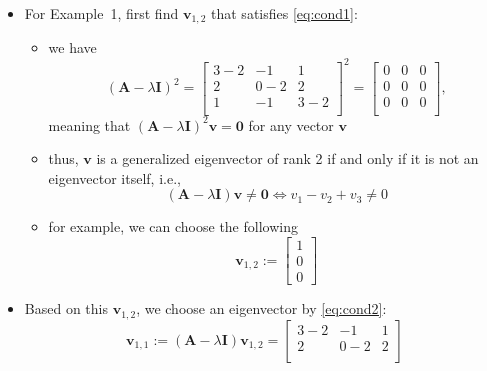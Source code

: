 \documentclass[12pt,a4paper]{article}
\begin{document}
\begin{itemize}
\begin{itemize}
  \item For Example~1,
    first find $\bm{v}_{1,2}$ that satisfies \eqref{eq:cond1}:
    \begin{itemize}
    \item we have
      \begin{equation}\nonumber%
        (\bm{A}-\lambda \bm{I})^{2} =
        \begin{bmatrix}
          3-2 & -1 & 1 \\
          2 & 0-2 & 2 \\
          1 & -1 & 3-2 \\
        \end{bmatrix}^{2}
        =
        \begin{bmatrix}
          0 & 0 & 0 \\
          0 & 0 & 0 \\
          0 & 0 & 0 \\
        \end{bmatrix},
      \end{equation}
      meaning that
      $(\bm{A}-\lambda \bm{I})^{2}\bm{v}=\bm{0}$ for any vector $\bm{v}$
    \item thus, $\bm{v}$ is a generalized eigenvector of rank 2 if and only if
      it is not an eigenvector itself, i.e.,
      \begin{equation}\nonumber%
        (\bm{A}-\lambda \bm{I})\bm{v}\neq \bm{0}
        \iff
        v_{1} - v_{2} + v_{3} \neq 0
      \end{equation}
    \item for example, we can choose the following
      \begin{equation}\nonumber%
        \bm{v}_{1,2} :=
        \begin{bmatrix}
          1 \\ 0 \\ 0
        \end{bmatrix}
      \end{equation}
    \end{itemize}
  \item Based on this $\bm{v}_{1,2}$, we choose an eigenvector by \eqref{eq:cond2}:
    \begin{equation}\nonumber%
      \bm{v}_{1,1}
      := (\bm{A}-\lambda\bm{I})\bm{v}_{1,2}
      = 
        \begin{bmatrix}
          3-2 & -1 & 1 \\
          2 & 0-2 & 2 \\

\end{bmatrix}
\end{equation}
\end{itemize}
\end{itemize}
\end{document}
